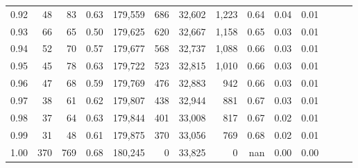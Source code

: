 \begin{tabular}{rrrrrrrrrrrrrr}
0.92 &     48 &   83 &  0.63 &  179,559 &      686 &  32,602 &   1,223 &  0.64 &  0.04 &      0.01 \\
0.93 &     66 &   65 &  0.50 &  179,625 &      620 &  32,667 &   1,158 &  0.65 &  0.03 &      0.01 \\
0.94 &     52 &   70 &  0.57 &  179,677 &      568 &  32,737 &   1,088 &  0.66 &  0.03 &      0.01 \\
0.95 &     45 &   78 &  0.63 &  179,722 &      523 &  32,815 &   1,010 &  0.66 &  0.03 &      0.01 \\
0.96 &     47 &   68 &  0.59 &  179,769 &      476 &  32,883 &     942 &  0.66 &  0.03 &      0.01 \\
0.97 &     38 &   61 &  0.62 &  179,807 &      438 &  32,944 &     881 &  0.67 &  0.03 &      0.01 \\
0.98 &     37 &   64 &  0.63 &  179,844 &      401 &  33,008 &     817 &  0.67 &  0.02 &      0.01 \\
0.99 &     31 &   48 &  0.61 &  179,875 &      370 &  33,056 &     769 &  0.68 &  0.02 &      0.01 \\
1.00 &    370 &  769 &  0.68 &  180,245 &        0 &  33,825 &       0 &   nan &  0.00 &      0.00 \\
\bottomrule
\end{tabular}
